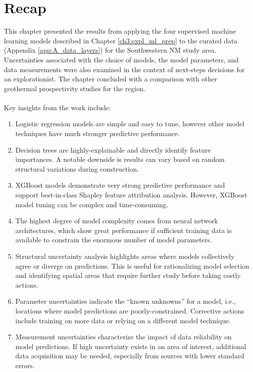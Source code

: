 \section{Recap}\label{ch5:recap}
This chapter presented the results from applying the four supervised machine learning models described in Chapter \ref{ch3:expl_ml_prep} to the curated data (Appendix \ref{app:A_data_layers}) for the Southwestern NM study area. Uncertainties associated with the choice of models, the model parameters, and data measurements were also examined in the context of next-steps decisions for an explorationist. The chapter concluded with a comparison with other geothermal prospectivity studies for the region.
\\
\\
Key insights from the work include:
\begin{enumerate}
    \item Logistic regression models are simple and easy to tune, however other model techniques have much stronger predictive performance.
    \item Decision trees are highly-explainable and directly identify feature importances. A notable downside is results can vary based on random structural variations during construction.
    \item XGBoost models demonstrate very strong predictive performance and support best-in-class Shapley feature attribution analysis. However, XGBoost model tuning can be complex and time-consuming.
    \item The highest degree of model complexity comes from neural network architectures, which show great performance if sufficient training data is available to constrain the enormous number of model parameters.
    \item Structural uncertainty analysis highlights areas where models collectively agree or diverge on predictions. This is useful for rationalizing model selection and identifying spatial areas that require further study before taking costly actions.
    \item Parameter uncertainties indicate the ``known unknowns'' for a model, i.e., locations where model predictions are poorly-constrained. Corrective actions include training on more data or relying on a different model technique.
    \item Measurement uncertainties characterize the impact of data reliability on model predictions. If high uncertainty exists in an area of interest, additional data acquisition may be needed, especially from sources with lower standard errors. 

\end{enumerate}
